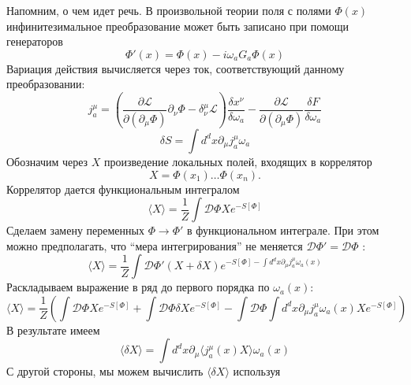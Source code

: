 \documentclass[a4paper,12pt]{article} \usepackage[utf8x]{inputenc} \usepackage[russian]{babel}
\theoremstyle{definition} \newtheorem{corollary}{Corollary}[theorem] \theoremstyle{definition}
\begin{document}
Напомним, о чем идет речь. В произвольной теории поля с полями $\Phi(x)$ инфинитезимальное
преобразование может быть записано при помощи генераторов
\begin{equation}
  \label{eq:198} \Phi'(x)=\Phi(x)-i\omega_{a} G_{a} \Phi(x)
\end{equation} Вариация действия вычисляется через ток, соответствующий данному преобразовании:
\begin{equation}
  \label{eq:199} j^{\mu}_{a}=\left(\frac{\partial \mathcal{L} }{\partial
(\partial_{\mu}\Phi)} \partial_{\nu}\Phi -\delta^{\mu}_{\nu}\mathcal{L}\right) \frac{\delta
x^{\nu}}{\delta \omega_{a}} - \frac{\partial \mathcal{L} }{\partial (\partial_{\mu}
\Phi)}\frac{\delta F}{\delta \omega_{a}}
\end{equation}
\begin{equation}
  \label{eq:200} \delta S =\int d^{d}x \partial_{\mu}j^{\mu}_{a} \omega_{a}
\end{equation} Обозначим через $X$ произведение локальных полей, входящих в коррелятор
\begin{equation}
  \label{eq:201} X=\Phi(x_{1})\dots \Phi(x_{n}).
\end{equation} Коррелятор дается функциональным интегралом
\begin{equation}
  \label{eq:202} \langle X\rangle = \frac{1}{Z}\int \mathcal{D} \Phi X e^{-S[\Phi]}
\end{equation} Сделаем замену переменных $\Phi\to \Phi'$ в функциональном интеграле. При этом можно
предполагать, что ``мера интегрирования'' не меняется $\mathcal{D}\Phi'=\mathcal{D}\Phi$
\cite{difrancesco1997cft}:
\begin{equation}
  \label{eq:203} \langle X\rangle = \frac{1}{Z} \int \mathcal{D} \Phi' (X+\delta X)e^{-S[\Phi]-\int
d^{d}x \partial_{\mu}j^{\mu}_{a}\omega_{a}(x)}
\end{equation} Раскладываем выражение в ряд до первого порядка по $\omega_{a}(x)$:
\begin{equation}
  \label{eq:204} \langle X\rangle=\frac{1}{Z} \left( \int \mathcal{D} \Phi X e^{-S[\Phi]}+\int
\mathcal{D} \Phi \delta X e^{-S[\Phi]} -\int \mathcal{D}\Phi \int
d^{d}x \partial_{\mu}j^{\mu}_{a}\omega_{a}(x) X e^{-S[\Phi]}\right)
\end{equation} В результате имеем
\begin{equation}
  \label{eq:205} \langle \delta X\rangle=\int d^{d}x \partial_{\mu}\langle j^{\mu}_{a}(x) X\rangle
\omega_{a}(x)
\end{equation} С другой стороны, мы можем вычислить $\langle\delta X\rangle$ используя
\end{document}
